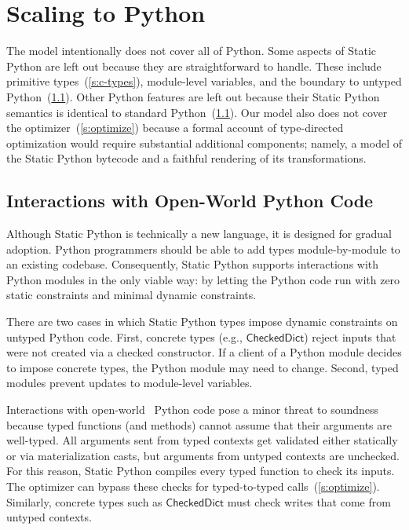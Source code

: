 \documentclass[english,cleveref,submission]{programming}
\newcommand{\SP}{Static Python}
\newcommand{\typefont}[1]{\mathsf{#1}}
\newcommand{\sptrawchkdict}{\typefont{CheckedDict}} %
\begin{document}
\section{Scaling to Python}
\label{s:impl}

The model intentionally does not cover all of Python.
Some aspects of \SP{} are left out because they are straightforward to
handle.
These include primitive types~(\cref{s:c-types}), module-level variables,
and the boundary to untyped Python~(\cref{s:py-boundary}).
Other Python features are left out because their \SP{} semantics is identical
to standard Python~(\cref{s:py-boundary}).
Our model also does not cover the optimizer~(\cref{s:optimize}) because
a formal account of type-directed optimization would require substantial additional
components; namely, a model of the \SP{} bytecode and a faithful rendering of its
transformations.


\subsection{Interactions with Open-World Python Code}
\label{s:py-boundary}

Although \SP{} is technically a new language, it is designed for gradual adoption.
Python programmers should be able to add types module-by-module to an
existing codebase.
Consequently, \SP{} supports interactions with Python modules in the only viable
way: by letting the Python code run with zero static constraints and minimal
dynamic constraints.

There are two cases in which \SP{} types impose dynamic constraints on untyped Python code.
First, concrete types (e.g., $\sptrawchkdict$)
reject inputs that were not created via a checked constructor.
If a client of a Python module decides to impose concrete types, the Python module
may need to change.
Second, typed modules prevent updates to module-level variables.

Interactions with {open-world}~\cite{vss-popl-2017} Python code pose a minor
threat to soundness because
typed functions (and methods) cannot assume that their arguments are
well-typed.
All arguments sent from typed contexts get validated either statically or
via materialization casts, but arguments from untyped contexts are unchecked.
For this reason, \SP{} compiles every typed function to check its inputs.
The optimizer can bypass these checks for typed-to-typed calls~(\cref{s:optimize}).
Similarly, concrete types such as $\sptrawchkdict$ must check writes that
come from untyped contexts.
\end{document}
